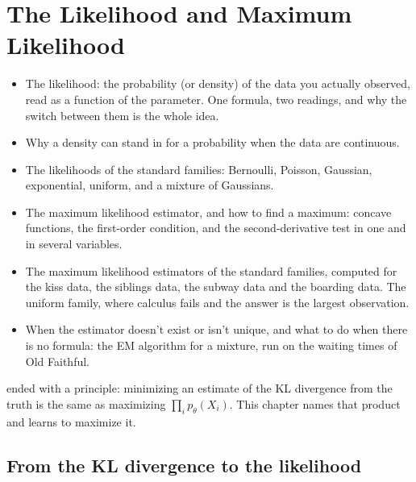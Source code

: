 \chapter{The Likelihood and Maximum Likelihood}
\label{ch:likelihood}

\begin{chaptergoals}
\begin{itemize}[nosep]
\item The likelihood: the probability (or density) of the data you actually observed, read as a function of the parameter. One formula, two readings, and why the switch between them is the whole idea.
\item Why a density can stand in for a probability when the data are continuous.
\item The likelihoods of the standard families: Bernoulli, Poisson, Gaussian, exponential, uniform, and a mixture of Gaussians.
\item The maximum likelihood estimator, and how to find a maximum: concave functions, the first-order condition, and the second-derivative test in one and in several variables.
\item The maximum likelihood estimators of the standard families, computed for the kiss data, the siblings data, the subway data and the boarding data. The uniform family, where calculus fails and the answer is the largest observation.
\item When the estimator doesn't exist or isn't unique, and what to do when there is no formula: the EM algorithm for a mixture, run on the waiting times of Old Faithful.
\end{itemize}
 ended with a principle: minimizing an estimate of the KL divergence from the truth is the same as maximizing $\prod_i p_\theta(X_i)$. This chapter names that product and learns to maximize it.
\end{chaptergoals}

\section{From the KL divergence to the likelihood}
\label{sec:lik-from-kl}


